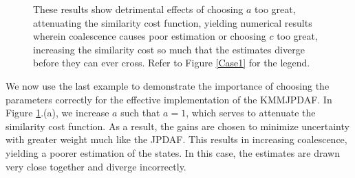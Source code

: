 \documentclass[letterpaper, 10pt, conference]{ieeeconf}
\begin{document}
\begin{figure}
\centerline{
	}
\centerline{
	}
\caption{These results show detrimental effects of choosing $a$ too great, attenuating the similarity cost function, yielding numerical results wherein coalescence causes poor estimation or choosing $c$ too great, increasing the similarity cost so much that the estimates diverge before they can ever cross. Refer to Figure \ref{Case1} for the legend.}
\label{changeParameters}
\end{figure}

We now use the last example to demonstrate the importance of choosing the parameters correctly for the effective implementation of the KMMJPDAF. In Figure \ref{changeParameters}.(a), we increase $a$ such that $a=1$, which serves to attenuate the similarity cost function. As a result, the gains are chosen to minimize uncertainty with greater weight much like the JPDAF. This results in increasing coalescence, yielding a poorer estimation of the states. In this case, the estimates are drawn very close together and diverge incorrectly.
\end{document}
